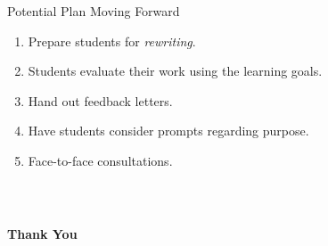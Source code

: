 \documentclass{beamer}
\newcommand{\be}{\begin{enumerate}}
\newcommand{\ee}{\end{enumerate}}
\begin{document}
{  \begin{block}{Potential Plan Moving Forward}
    \be
    \item Prepare students for \textit{rewriting}.
    \item Students evaluate their work using the learning goals.
    \item Hand out feedback letters.
    \item Have students consider prompts regarding purpose.
    \item Face-to-face consultations.
    \ee
  \end{block}
}

\frame
{
  \frametitle{~}
  \begin{center}\LARGE{\textbf{Thank You}}\end{center}
}


\frame[label=app]
\end{document}
